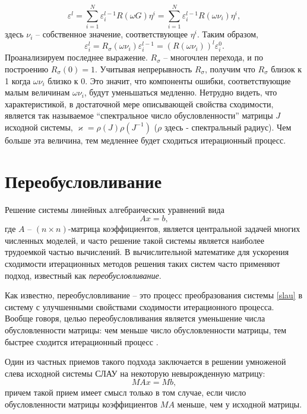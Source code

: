 \documentclass[a4paper,14pt]{extreport}
\begin{document}
	$$ \varepsilon^l = \sum_{i = 1}^{N}\varepsilon_i^{l-1}R(\omega G) \eta^i = 		\sum_{i=1}^{N}\varepsilon_i^{l-1}R(\omega \nu_i )\eta^i,$$
здесь $\nu_i$ -- собственное значение, соответствующее $\eta^i$. Таким образом,%
	$$ \varepsilon_i^l = R_\sigma(\omega \nu_i) \varepsilon_i^{l-1} = (R(\omega \nu_i))^l\varepsilon_i^0.$$
Проанализируем последнее выражение. $R_\sigma$ -- многочлен перехода, и по построению $R_\sigma(0) = 1$. Учитывая непрерывность $R_\sigma$, получим что $R_\sigma$ близок к 1 когда $\omega \nu_i$ близко к 0. Это значит, что компоненты ошибки, соответствующие малым величинам $\omega \nu_i$, будут уменьшаться медленно. Нетрудно видеть, что характеристикой,  в достаточной мере описывающей свойства сходимости, является так называемое ``спектральное число обусловленности'' матрицы $J$ исходной системы, $\varkappa = \rho(J) \rho(J^{-1})$ ($\rho$ здесь - спектральный радиус). Чем больше эта величина, тем медленнее будет сходиться итерационный процесс.
  
  \section{Переобусловливание}
  \label{s:precond}
  Решение системы линейных алгебраических уравнений вида
  \begin{equation}
	\label{slau}
	Ax=b,
	\end{equation}
 где $A$ -- $(n \times n)$-матрица коэффициентов, является центральной задачей многих численных моделей, и часто решение такой системы является наиболее трудоемкой частью вычислений. В вычислительной математике для ускорения сходимости итерационных методов решения таких систем часто применяют подход, известный как \textit{переобусловливание}. 
	
	Как известно, переобусловливание -- это процесс преобразования системы \eqref{slau}  в систему с улучшенными свойствами сходимости итерационного процесса. Вообще говоря, целью переобусловливания является уменьшение числа обусловленности матрицы: чем меньше число обусловленности матрицы, тем быстрее сходится итерационный процесс \cite{benzi}.
	
	Один из частных приемов такого подхода	заключается в решении умноженой слева исходной системы СЛАУ на некоторую невырожденную матрицу:
	\begin{equation}
	\label{precondslau1}
	MAx=Mb,
	\end{equation}
причем такой прием имеет смысл только в том случае, если число обусловленности матрицы коэффициентов $MA$ меньше, чем у исходной матрицы.	
	
\end{document}

